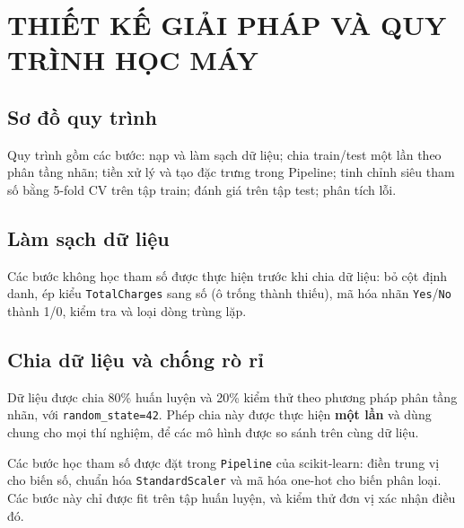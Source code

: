 \chapter{THIẾT KẾ GIẢI PHÁP VÀ QUY TRÌNH HỌC MÁY}

\section{Sơ đồ quy trình}
Quy trình gồm các bước: nạp và làm sạch dữ liệu; chia train/test một lần theo phân tầng nhãn; tiền xử lý và tạo đặc trưng
trong Pipeline; tinh chỉnh siêu tham số bằng 5-fold CV trên tập train; đánh giá trên tập test; phân tích lỗi.

\section{Làm sạch dữ liệu}
Các bước không học tham số được thực hiện trước khi chia dữ liệu: bỏ cột định danh, ép kiểu \texttt{TotalCharges} sang số
(ô trống thành thiếu), mã hóa nhãn \texttt{Yes}/\texttt{No} thành 1/0, kiểm tra và loại dòng trùng lặp.

\section{Chia dữ liệu và chống rò rỉ}
Dữ liệu được chia 80\% huấn luyện và 20\% kiểm thử theo phương pháp phân tầng nhãn, với \texttt{random\_state=42}.
Phép chia này được thực hiện \textbf{một lần} và dùng chung cho mọi thí nghiệm, để các mô hình được so sánh trên cùng dữ liệu.

Các bước học tham số được đặt trong \texttt{Pipeline} của scikit-learn: điền trung vị cho biến số, chuẩn hóa \texttt{StandardScaler}
và mã hóa one-hot cho biến phân loại. Các bước này chỉ được fit trên tập huấn luyện, và kiểm thử đơn vị xác nhận điều đó.

